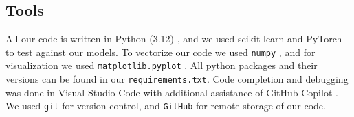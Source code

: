 \subsection{Tools}\label{subsec:tools}

All our code is written in Python (3.12) \cite{Python},  and we used scikit-learn \cite{scikit-learn} and PyTorch\cite{PyTorch} to test against our models. To vectorize our code we used \verb|numpy| \cite{Numpy}, and for visualization we used \verb|matplotlib.pyplot| \cite{Matplotlib}. All python packages and their versions can be found in our \verb|requirements.txt|. Code completion and debugging was done in Visual Studio Code \cite{VSCode} with additional assistance of GitHub Copilot \cite{Copilot}. We used \verb|git| \cite{Git} for version control, and \verb|GitHub| \cite{GitHub} for remote storage of our code.
